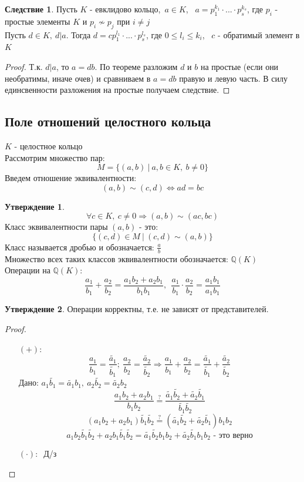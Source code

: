 \documentclass[a4paper, 12pt]{article}
\newcommand{\Q}{\mathbb Q}
\newcommand\tab[1][.5cm]{\hspace*{#1}}
\newcounter{concount}
\theoremstyle{definition}
\newtheorem{consequensenum}[concount]{Следствие}
\newtheorem*{subtheorem}{Утверждение}
\begin{document}
  \begin{consequensenum}
    Пусть $K$ - евклидово кольцо,\ $a\in K$, \ $a=p_1^{k_1}\cdot ...\cdot p_s^{k_s}$, где $p_i$ - простые элементы $K$ и $p_i \not \sim p_j$ при $i \neq j$\\
    Пусть $d\in K, \ d|a$. Тогда $d = c p_1^{l_1}\cdot ... \cdot p_s^{l_s}$, где $0\leq l_i\leq k_i$, \ $c$ - обратимый элемент в $K$             
  \end{consequensenum}
  \begin{proof}
    Т.к. $d|a$, то $a = db$. По теореме разложим $d$ и $b$ на простые (если они необратимы, иначе очев) и сравниваем в $a = db$ правую и левую часть. В силу единсвенности разложения на простые получаем следствие.     
  \end{proof}
  \subsection{Поле отношений целостного кольца}
  $K$ - целостное кольцо\\
  Рассмотрим множество пар: 
  $$M = \{(a, b) \ | \ a, b \in K, \ b\neq 0\}$$
  Введем отношение эквивалентности:
  $$(a, b)\sim (c, d) \Longleftrightarrow ad = bc$$
  \begin{subtheorem}
    $$\forall c \in K, \ c\neq 0 \Longrightarrow (a, b) \sim (ac, bc)$$
    Класс эквивалентности пары $(a, b)$ - это: 
    $$\{(c, d) \in M \ | \ (c, d) \sim (a, b)\}$$
    Класс называется дробью и обозначается: $\frac{a}{b}$ \\
    Множество всех таких классов эквивалентности обозначается: $\Q (K)$ \\
    Операции на $\Q (K)$: 
    $$\frac{a_1}{b_1} + \frac{a_2}{b_2} = \frac{a_1b_2 + a_2b_1}{b_1b_1}, \ \ \frac{a_1}{b_1} \cdot \frac{a_2}{b_2} = \frac{a_1b_1}{a_1b_1}$$ 
  \end{subtheorem}
  \begin{subtheorem}
    Операции корректны, т.е. не зависят от представителей.
  \end{subtheorem}
  \begin{proof}\tab
    \begin{itemize} 
      \item[$(+): \ $] 
      $$\frac{a_1}{b_1} = \frac{\widetilde{a_1}}{\widetilde{b_1}}; \ \frac{a_2}{b_2} = \frac{\widetilde{a_2}}{\widetilde{b_2}} \Longrightarrow \frac{a_1}{b_1} + \frac{a_2}{b_2} = \frac{\widetilde{a_1}}{\widetilde{b_1}} + \frac{\widetilde{a_2}}{\widetilde{b_2}}$$
      Дано: $a_1 \widetilde{b_1} = \widetilde{a_1}b_1, \ a_2 \widetilde{b_2} = \widetilde{a_2}b_2$
      $$\frac{a_1b_2 + a_2b_1}{b_1b_2} \overset{?}{=}  \frac{\widetilde{a_1} \widetilde{b_2} + \widetilde{a_2} \widetilde{b_1}}{\widetilde{b_1} \widetilde{b_2}}$$
      $$(a_1b_2 + a_2b_1) \widetilde{b_1} \widetilde{b_2} \overset{?}{=} (\widetilde{a_1} \widetilde{b_2} + \widetilde{a_2} \widetilde{b_1})b_1b_2$$
      $$a_1b_2 \widetilde{b_1} \widetilde{b_2}+ a_2b_1 \widetilde{b_1} \widetilde{b_2} = \widetilde{a_1} \widetilde{b_2} b_1b_2 + \widetilde{a_2} \widetilde{b_1} b_1b_2 \text{ - это верно}$$
      \item[ $(\cdot): \ $ ] Д/з
    \end{itemize}
  \end{proof} 
\end{document}
